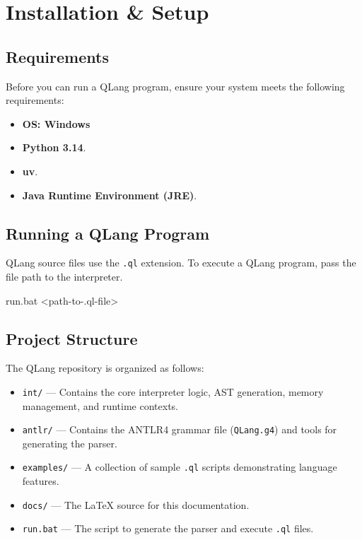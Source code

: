 \section{Installation \& Setup}\label{sec:installation-and-setup}

\subsection{Requirements}\label{sec:requirements}

Before you can run a QLang program, ensure your system meets the following requirements:

\begin{itemize}
    \item \textbf{OS: Windows}
    \item \textbf{Python 3.14}.
    \item \textbf{uv}.
    \item \textbf{Java Runtime Environment (JRE)}.
\end{itemize}

\subsection{Running a QLang Program}\label{sec:running}

QLang source files use the \texttt{.ql} extension. To execute a QLang program, pass the file path to the interpreter.

\begin{codebox}
run.bat <path-to-.ql-file>
\end{codebox}

\subsection{Project Structure}\label{sec:project-structure}

The QLang repository is organized as follows:

\begin{itemize}
    \item \texttt{int/} — Contains the core interpreter logic, AST generation, memory management, and runtime contexts.
    \item \texttt{antlr/} — Contains the ANTLR4 grammar file (\texttt{QLang.g4}) and tools for generating the parser.
    \item \texttt{examples/} — A collection of sample \texttt{.ql} scripts demonstrating language features.
    \item \texttt{docs/} — The LaTeX source for this documentation.
    \item \texttt{run.bat} — The script to generate the parser and execute \texttt{.ql} files.
\end{itemize}
